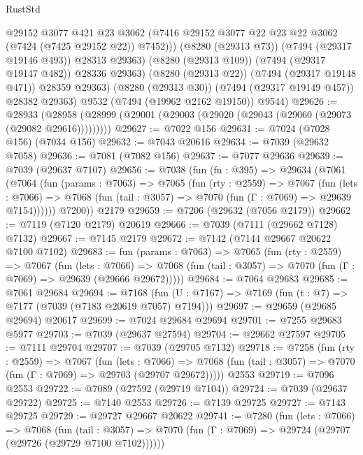\begin{lexlean}{RustStd}
\begin{coremodule}
                  @29152
                  @3077
                  @421
                  @23
                  @3062
                  (@7416 @29152 @3077 @22 @23 @22 @3062 (@7424 (@7425 @29152 @22)) @7452)))
              (@8280 (@29313 @73))
              (@7494 (@29317 @19146 @493))
              @28313
              @29363)
            (@8280 (@29313 @109))
            (@7494 (@29317 @19147 @482))
            @28336
            @29363)
          (@8280 (@29313 @22))
          (@7494 (@29317 @19148 @471))
          @28359
          @29363)
        (@8280 (@29313 @30))
        (@7494 (@29317 @19149 @457))
        @28382
        @29363)
      @9532
      (@7494 (@19962 @2162 @19150))
      @9544)
@29626 := @28933
    (@28958 (@28999 (@29001 (@29003 (@29020 (@29043 (@29060 (@29073 (@29082 @29616)))))))))
@29627 := @7022 @156
@29631 := @7024 (@7028 @156) (@7034 @156)
@29632 := @7043 @20616
@29634 := @7039 (@29632 @7058)
@29636 := @7081 (@7082 @156)
@29637 := @7077 @29636
@29639 := @7039 (@29637 @7107)
@29656 := @7038
    (fun (fn : @395) =>
    @29634
      (@7061
        (@7064
          (fun (params : @7063) =>
          @7065
            (fun (rty : @2559) =>
            @7067
              (fun (lets : @7066) =>
              @7068 (fun (tail : @3057) => @7070 (fun (Γ : @7069) => @29639 @7154))))))
        @7200))
    @2179
@29659 := @7206 (@29632 (@7056 @2179))
@29662 := @7119 (@7120 @2179) @20619
@29666 := @7039 (@7111 (@29662 @7128) @7132)
@29667 := @7145 @2179
@29672 := @7142 (@7144 @29667 @20622 @7100 @7102)
@29683 := fun (params : @7063) =>
  @7065
    (fun (rty : @2559) =>
    @7067
      (fun (lets : @7066) =>
      @7068 (fun (tail : @3057) => @7070 (fun (Γ : @7069) => @29639 (@29666 @29672)))))
@29684 := @7064 @29683
@29685 := @7061 @29684
@29694 := @7168
    (fun (U : @7167) => @7169 (fun (t : @7) => @7177 (@7039 (@7183 @20619 @7057) @7194)))
@29697 := @29659 (@29685 @29694) @20617
@29699 := @7024 @29684 @29694
@29701 := @7255 @29683 @5977
@29703 := @7039 (@29637 @27594)
@29704 := @29662 @27597
@29705 := @7111 @29704
@29707 := @7039 (@29705 @7132)
@29718 := @7258
    (fun (rty : @2559) =>
    @7067
      (fun (lets : @7066) =>
      @7068 (fun (tail : @3057) => @7070 (fun (Γ : @7069) => @29703 (@29707 @29672)))))
    @2553
@29719 := @7096 @2553
@29722 := @7089 (@27592 (@29719 @7104))
@29724 := @7039 (@29637 @29722)
@29725 := @7140 @2553
@29726 := @7139 @29725
@29727 := @7143 @29725
@29729 := @29727 @29667 @20622
@29741 := @7280
    (fun (lets : @7066) =>
    @7068
      (fun (tail : @3057) =>
      @7070 (fun (Γ : @7069) => @29724 (@29707 (@29726 (@29729 @7100 @7102))))))

\end{coremodule}
\end{lexlean}
